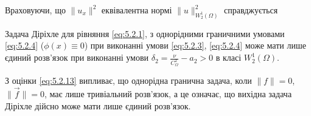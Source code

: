 Враховуючи, що $\|u_x\|^2$ еквівалентна нормі $\|u\|_{W_2^1(\Omega)}^2$ справджується 
\begin{theorem}
    Задача Діріхле для рівняння \eqref{eq:5.2.1}, з однорідними граничними умовами \eqref{eq:5.2.4} ($\phi(x) \equiv 0$) при виконанні умови \eqref{eq:5.2.3}, \eqref{eq:5.2.4} може мати лише єдиний розв'язок при виконанні умови $\delta_2 = \frac{\nu}{C_\Omega^2} - a_2 > 0$ в класі $W_2^1(\Omega)$.
\end{theorem}

\begin{remark}
    З оцінки \eqref{eq:5.2.13} випливає, що однорідна гранична задача, коли $\|f\| = 0$, $\|\vec f\| = 0$, має лише тривіальний розв'язок, а це означає, що вихідна задача Діріхле дійсно може мати лише єдиний розв'язок.
\end{remark}

